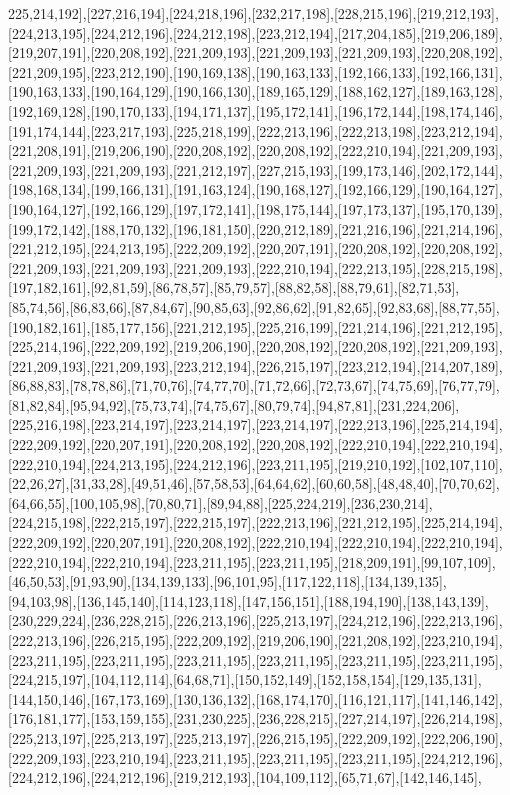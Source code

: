 225,214,192],[227,216,194],[224,218,196],[232,217,198],[228,215,196],[219,212,193],[224,213,195],[224,212,196],[224,212,198],[223,212,194],[217,204,185],[219,206,189],[219,207,191],[220,208,192],[221,209,193],[221,209,193],[221,209,193],[220,208,192],[221,209,195],[223,212,190],[190,169,138],[190,163,133],[192,166,133],[192,166,131],[190,163,133],[190,164,129],[190,166,130],[189,165,129],[188,162,127],[189,163,128],[192,169,128],[190,170,133],[194,171,137],[195,172,141],[196,172,144],[198,174,146],[191,174,144],[223,217,193],[225,218,199],[222,213,196],[222,213,198],[223,212,194],[221,208,191],[219,206,190],[220,208,192],[220,208,192],[222,210,194],[221,209,193],[221,209,193],[221,209,193],[221,212,197],[227,215,193],[199,173,146],[202,172,144],[198,168,134],[199,166,131],[191,163,124],[190,168,127],[192,166,129],[190,164,127],[190,164,127],[192,166,129],[197,172,141],[198,175,144],[197,173,137],[195,170,139],[199,172,142],[188,170,132],[196,181,150],[220,212,189],[221,216,196],[221,214,196],[221,212,195],[224,213,195],[222,209,192],[220,207,191],[220,208,192],[220,208,192],[221,209,193],[221,209,193],[221,209,193],[222,210,194],[222,213,195],[228,215,198],[197,182,161],[92,81,59],[86,78,57],[85,79,57],[88,82,58],[88,79,61],[82,71,53],[85,74,56],[86,83,66],[87,84,67],[90,85,63],[92,86,62],[91,82,65],[92,83,68],[88,77,55],[190,182,161],[185,177,156],[221,212,195],[225,216,199],[221,214,196],[221,212,195],[225,214,196],[222,209,192],[219,206,190],[220,208,192],[220,208,192],[221,209,193],[221,209,193],[221,209,193],[223,212,194],[226,215,197],[223,212,194],[214,207,189],[86,88,83],[78,78,86],[71,70,76],[74,77,70],[71,72,66],[72,73,67],[74,75,69],[76,77,79],[81,82,84],[95,94,92],[75,73,74],[74,75,67],[80,79,74],[94,87,81],[231,224,206],[225,216,198],[223,214,197],[223,214,197],[223,214,197],[222,213,196],[225,214,194],[222,209,192],[220,207,191],[220,208,192],[220,208,192],[222,210,194],[222,210,194],[222,210,194],[224,213,195],[224,212,196],[223,211,195],[219,210,192],[102,107,110],[22,26,27],[31,33,28],[49,51,46],[57,58,53],[64,64,62],[60,60,58],[48,48,40],[70,70,62],[64,66,55],[100,105,98],[70,80,71],[89,94,88],[225,224,219],[236,230,214],[224,215,198],[222,215,197],[222,215,197],[222,213,196],[221,212,195],[225,214,194],[222,209,192],[220,207,191],[220,208,192],[222,210,194],[222,210,194],[222,210,194],[222,210,194],[222,210,194],[223,211,195],[223,211,195],[218,209,191],[99,107,109],[46,50,53],[91,93,90],[134,139,133],[96,101,95],[117,122,118],[134,139,135],[94,103,98],[136,145,140],[114,123,118],[147,156,151],[188,194,190],[138,143,139],[230,229,224],[236,228,215],[226,213,196],[225,213,197],[224,212,196],[222,213,196],[222,213,196],[226,215,195],[222,209,192],[219,206,190],[221,208,192],[223,210,194],[223,211,195],[223,211,195],[223,211,195],[223,211,195],[223,211,195],[223,211,195],[224,215,197],[104,112,114],[64,68,71],[150,152,149],[152,158,154],[129,135,131],[144,150,146],[167,173,169],[130,136,132],[168,174,170],[116,121,117],[141,146,142],[176,181,177],[153,159,155],[231,230,225],[236,228,215],[227,214,197],[226,214,198],[225,213,197],[225,213,197],[225,213,197],[226,215,195],[222,209,192],[222,206,190],[222,209,193],[223,210,194],[223,211,195],[223,211,195],[223,211,195],[224,212,196],[224,212,196],[224,212,196],[219,212,193],[104,109,112],[65,71,67],[142,146,145],